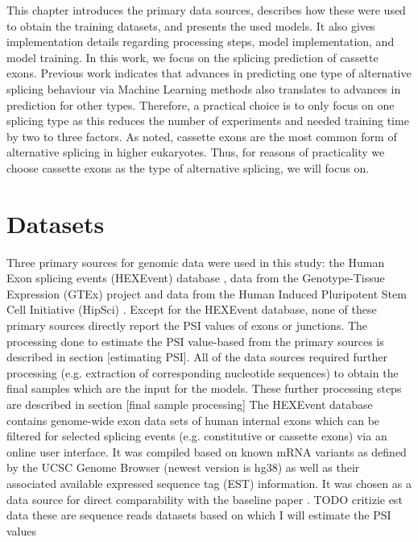 This chapter introduces the primary data sources, describes how these were used to obtain the training datasets, and presents the used models. It also gives implementation details regarding processing steps, model implementation, and model training.
In this work, we focus on the splicing prediction of cassette exons. Previous work indicates that advances in predicting one type of alternative splicing behaviour via Machine Learning methods also translates to advances in prediction for other types. Therefore, a practical choice is to only focus on one splicing type as this reduces the number of experiments and needed training time by two to three factors. As noted, cassette exons are the most common form of alternative splicing in higher eukaryotes. Thus, for reasons of practicality we choose cassette exons as the type of alternative splicing, we will focus on.
\section{Datasets}\label{sec:datasets}
Three primary sources for genomic data were used in this study: the Human Exon splicing events (HEXEvent) database \cite{hexevent}, data from the Genotype-Tissue Expression (GTEx) project \cite{gtex} and data from the Human Induced Pluripotent Stem Cell Initiative (HipSci) \cite{hipsci}. Except for the HEXEvent database, none of these primary sources directly report the PSI values of exons or junctions. The processing done to estimate the PSI value-based from the primary sources is described in section [estimating PSI]. All of the data sources required further processing (e.g. extraction of corresponding nucleotide sequences) to obtain the final samples which are the input for the models. These further processing steps are described in section [final sample processing]
The HEXEvent database contains genome-wide exon data sets of human internal exons which can be filtered for selected splicing events (e.g. constitutive or cassette exons) via an online user interface. It was compiled based on known mRNA variants as defined by the UCSC Genome Browser (newest version is hg38) as well as their associated available expressed sequence tag (EST) information.
It was chosen as a data source for direct comparability with the baseline paper \cite{dsc}.
TODO critizie est data
these are sequence reads datasets based on which I will estimate the PSI values
